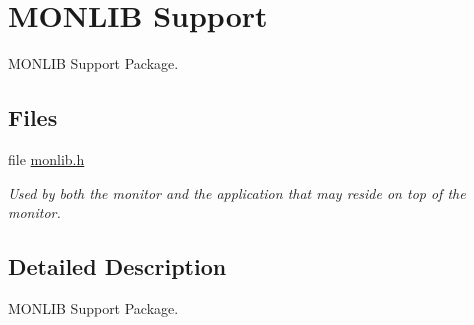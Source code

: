 \hypertarget{group__shared__monlib}{}\section{M\+O\+N\+L\+IB Support}
\label{group__shared__monlib}


M\+O\+N\+L\+IB Support Package.  


\subsection*{Files}
\begin{DoxyCompactItemize}
\item 
file \mbox{\hyperlink{monlib_8h}{monlib.\+h}}
\begin{DoxyCompactList}\small\item\em Used by both the monitor and the application that may reside on top of the monitor. \end{DoxyCompactList}\end{DoxyCompactItemize}


\subsection{Detailed Description}
M\+O\+N\+L\+IB Support Package. 

